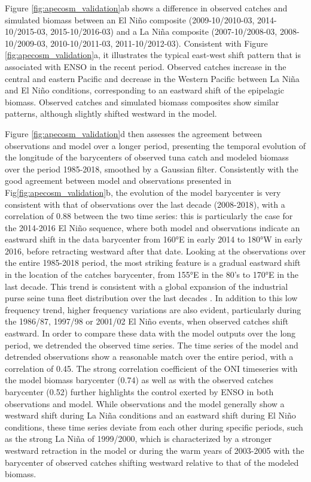 Figure \ref{fig:apecosm_validation}ab shows a difference in observed catches and simulated biomass between an El Niño composite (2009-10/2010-03, 2014-10/2015-03, 2015-10/2016-03) and a La Niña composite (2007-10/2008-03, 2008-10/2009-03, 2010-10/2011-03, 2011-10/2012-03). Consistent with Figure \ref{fig:apecosm_validation}a, it illustrates the typical east-west shift pattern that is associated with ENSO in the recent period. Observed catches increase in the central and eastern Pacific and decrease in the Western Pacific between La Niña and El Niño conditions, corresponding to an eastward shift of the epipelagic biomass. Observed catches and simulated biomass composites show similar patterns, although slightly shifted westward in the model.

Figure \ref{fig:apecosm_validation}d then assesses the agreement between observations and model over a longer period,  presenting the temporal evolution of the longitude of the barycenters of observed tuna catch and modeled biomass over the period 1985-2018, smoothed by a Gaussian filter. Consistently with the good agreement between model and observations presented in Fig\ref{fig:apecosm_validation}b, the evolution of the model barycenter  is very consistent with that of observations over the last decade (2008-2018), with a correlation of 0.88 between the two time series: this is particularly the case for the 2014-2016 El Niño sequence, where both model and observations indicate an eastward shift in the data barycenter from 160°E in early 2014 to 180°W in early 2016, before retracting westward after that date. Looking at the observations over the entire 1985-2018 period, the most striking feature is a gradual eastward shift in the location of the catches barycenter, from 155°E in the 80's to 170°E in the last decade. This trend is
consistent with a global expansion of the industrial purse seine tuna fleet distribution over the last decades \citep{coulterUsingHarmonizedHistorical2020}. 
In addition to this low frequency trend, higher frequency variations are also evident, particularly during the 1986/87, 1997/98 or 2001/02 El Niño events, when observed catches shift eastward. In order to compare these data with the model outputs over the long period, we detrended the observed time series. The time series of the model and detrended observations show a reasonable match over the entire period, with a correlation of 0.45. The strong correlation coefficient of the ONI timeseries with the model biomass barycenter (0.74) as well as with the observed catches barycenter (0.52) further highlights the control exerted by ENSO in both observations and model. While observations and the model generally show a westward shift during La Niña conditions and an eastward shift during El Niño conditions, these time series deviate from each other during specific periods, such as the strong La Niña of 1999/2000, which is characterized by a stronger westward retraction in the model or during the warm years of 2003-2005 with the barycenter of observed catches shifting westward relative to that of the modeled biomass.

